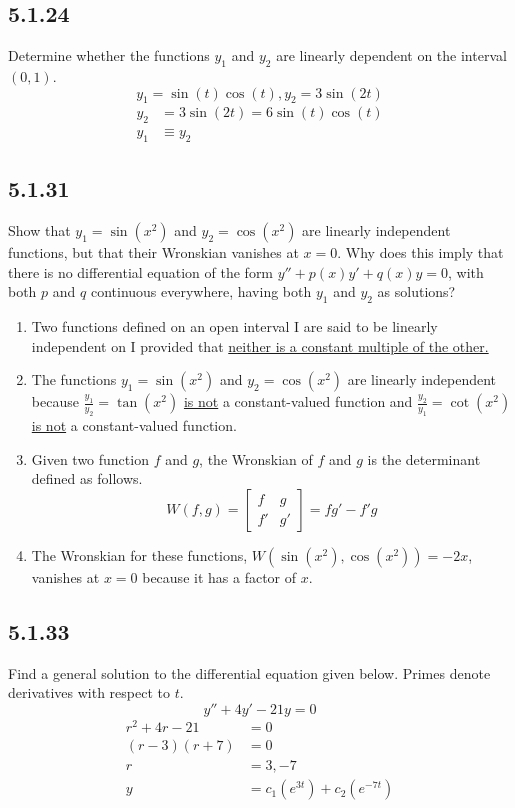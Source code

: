 \documentclass{article}
\begin{document}
\subsection{5.1.24}
Determine whether the functions $ y_1 $ and $ y_2 $ are linearly dependent on the interval $ (0,1) $.
$$ y_1 = \sin(t)\cos(t), y_2 = 3\sin(2t) $$
\begin{align*}
	y_2 & = 3\sin(2t) = 6\sin(t)\cos(t) \\
	y_1 & \equiv y_2
\end{align*}

\subsection{5.1.31}
Show that $ y_1 = \sin(x^2) $ and $ y_2 = \cos(x^2) $ are linearly independent functions, but that their Wronskian vanishes at $ x = 0 $. Why does this imply that there is no differential equation of the form $ y'' + p(x)y' + q(x)y = 0 $, with both $ p $ and $ q $ continuous everywhere, having both $ y_1 $ and $ y_2 $ as solutions?
\begin{enumerate}[label=\textbf{(\alph*)}]
	\item Two functions defined on an open interval I are said to be linearly independent on I provided that \underline{neither is a constant multiple of the other.}
	\item
		The functions $ y_1 = \sin(x^2) $ and $ y_2 = \cos(x^2) $ are linearly independent because $ \frac{y_1}{y_2} = \tan(x^2) $ \underline{is not} a constant-valued function and $ \frac{y_2}{y_1} = \cot(x^2) $ \underline{is not} a constant-valued function.
	\item
		Given two function $ f $ and $ g $, the Wronskian of $ f $ and $ g $ is the determinant defined as follows.
		$$ W(f,g) = \begin{bmatrix} f & g \\ f' & g' \end{bmatrix} = fg' - f'g $$
	\item
		The Wronskian for these functions, $ W(\sin(x^2), \cos(x^2)) = -2x $, vanishes at $ x = 0 $ because it has a factor of $ x $.
\end{enumerate}

\subsection{5.1.33}
Find a general solution to the differential equation given below. Primes denote derivatives with respect to $ t $.
$$ y'' + 4y' - 21y = 0 $$
\begin{align*}
	r^2 + 4r - 21 & = 0 \\
	(r - 3)(r + 7) & = 0 \\
	r & = 3, -7 \\
	y & = c_1(e^{3t}) + c_2(e^{-7t})
\end{align*}
\end{document}
